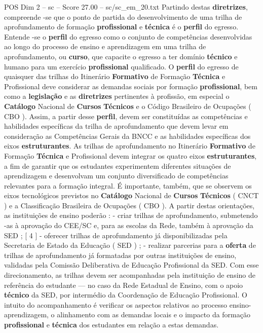 \begin{textsample}{POS Dim 2 – sc – Score 27.00 – sc/sc\_em\_20.txt}
Partindo destas \textbf{diretrizes}, compreende -se que o ponto de partida do desenvolvimento de uma trilha de aprofundamento de formação \textbf{profissional} e \textbf{técnica} é o \textbf{perfil} do egresso.
Entende -se o \textbf{perfil} do egresso como o conjunto de competências desenvolvidas ao longo do processo de ensino e aprendizagem em uma trilha de aprofundamento, ou \textbf{curso}, que capacite o egresso a ter domínio \textbf{técnico} e humano para um exercício \textbf{profissional} qualificado.
O \textbf{perfil} do egresso de quaisquer das trilhas do Itinerário \textbf{Formativo} de Formação \textbf{Técnica} e Profissional deve considerar as demandas sociais por formação \textbf{profissional}, bem como a \textbf{legislação} e as \textbf{diretrizes} pertinentes à profissão, em especial o \textbf{Catálogo} Nacional de \textbf{Cursos} \textbf{Técnicos} e o Código Brasileiro de Ocupações ( CBO ).
Assim, a partir desse \textbf{perfil}, devem ser constituídas as competências e habilidades específicas da trilha de aprofundamento que devem levar em consideração as Competências Gerais da BNCC e as habilidades específicas dos eixos \textbf{estruturantes}.
As trilhas de aprofundamento no Itinerário \textbf{Formativo} de Formação \textbf{Técnica} e Profissional devem integrar os quatro eixos \textbf{estruturantes}, a fim de garantir que os estudantes experimentem diferentes situações de aprendizagem e desenvolvam um conjunto diversificado de competências relevantes para a formação integral.
É importante, também, que se observem os eixos tecnológicos previstos no \textbf{Catálogo} Nacional de \textbf{Cursos} \textbf{Técnicos} ( CNCT ) e a Classificação Brasileira de Ocupações ( CBO ).
A partir destas orientações, as instituições de ensino poderão : - criar trilhas de aprofundamento, submetendo -as à aprovação do CEE/SC e, para as escolas da Rede, também à aprovação da SED ; [ 4 ] - oferecer trilhas de aprofundamento já disponibilizadas pela Secretaria de Estado da Educação ( SED ) ; - realizar parcerias para a \textbf{oferta} de trilhas de aprofundamento já formatadas por outras instituições de ensino, validadas pela Comissão Deliberativa de Educação Profissional da SED.
Com esse direcionamento, as trilhas devem ser acompanhadas pela instituição de ensino de referência do estudante — no caso da Rede Estadual de Ensino, com o apoio \textbf{técnico} da SED, por intermédio da Coordenação de Educação Profissional.
O intuito do acompanhamento é verificar os aspectos relativos ao processo ensino-aprendizagem, o alinhamento com as demandas locais e o impacto da formação \textbf{profissional} e \textbf{técnica} dos estudantes em relação a estas demandas.

\end{textsample}
